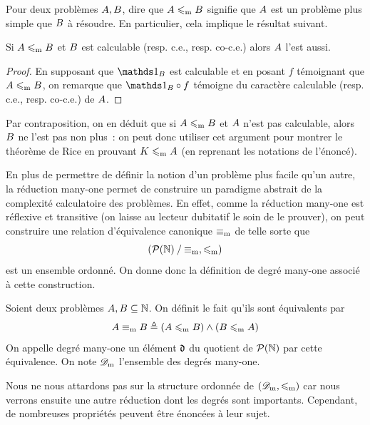 Pour deux problèmes $A,B$, dire que $A \leqslant_{\mathrm{m}} B$
signifie que $A$ est un problème plus simple que $B$ à résoudre. En
particulier, cela implique le résultat suivant.

\begin{proposition}
  Si $A \leqslant_{\mathrm{m}} B$ et $B$ est calculable
  (resp. c.e., resp. co-c.e.) alors $A$ l'est aussi.
\end{proposition}

\begin{proof}
  En supposant que $\indicP{\varPtB}$ est calculable et en posant $f$ témoignant
  que $A \leqslant_{\mathrm{m}} B$, on remarque que $\indicP{\varPtB} \circ f$
  témoigne du caractère calculable (resp. c.e., resp. co-c.e.) de $A$.
\end{proof}

\begin{remark}
  Par contraposition, on en déduit que si $A \leqslant_{\mathrm{m}} B$ et $A$
  n'est pas calculable, alors $B$ ne l'est pas non plus~: on peut donc
  utiliser cet argument pour montrer le théorème de Rice en prouvant
  $K \leqslant_{\mathrm{m}} A$ (en reprenant les notations de l'énoncé).
\end{remark}

En plus de permettre de définir la notion d'un problème plus facile qu'un
autre, la réduction many-one permet de construire un paradigme abstrait de la
complexité calculatoire des problèmes. En effet, comme la réduction many-one
est réflexive et transitive (on laisse au lecteur dubitatif le soin de le
prouver), on peut construire une relation d'équivalence canonique $\equiv_{\mathrm{m}}$
de telle sorte que
\[(\mathord{\mathcal{P}(\mathbb N)}\mathbin{/}\mathord{\equiv_{\mathrm{m}}}, \leqslant_{\mathrm{m}})\]
est un ensemble ordonné. On donne donc la définition de degré many-one associé
à cette construction.

\begin{definition}
  Soient deux problèmes $A,B\subseteq \mathbb N$. On définit le fait qu'ils
  sont équivalents par
  \[A \equiv_{\mathrm{m}} B \triangleq
  (A \leqslant_{\mathrm{m}} B) \land (B \leqslant_{\mathrm{m}} A)\]
  On appelle degré many-one un élément $\mathfrak{d}$ du quotient de $\mathcal{P}(\mathbb N)$
  par cette équivalence.
  On note $\ManyDegrees$ l'ensemble des degrés many-one.
  \index[notation]{$\ManyDegrees$}
\end{definition}

Nous ne nous attardons pas sur la structure ordonnée de
$(\mathscr{D}_{\mathrm{m}},\leqslant_{\mathrm{m}})$ car nous verrons ensuite une autre réduction dont les
degrés sont importants. Cependant, de nombreuses propriétés peuvent être
énoncées à leur sujet.

